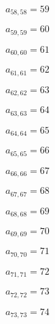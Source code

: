 \documentclass[a4paper,12pt]{article}
\begin{document}
$a _{ 58, 58 } = 59$

$a _{ 59, 59 } = 60$

$a _{ 60, 60 } = 61$

$a _{ 61, 61 } = 62$

$a _{ 62, 62 } = 63$

$a _{ 63, 63 } = 64$

$a _{ 64, 64 } = 65$

$a _{ 65, 65 } = 66$

$a _{ 66, 66 } = 67$

$a _{ 67, 67 } = 68$

$a _{ 68, 68 } = 69$

$a _{ 69, 69 } = 70$

$a _{ 70, 70 } = 71$

$a _{ 71, 71 } = 72$

$a _{ 72, 72 } = 73$

$a _{ 73, 73 } = 74$
\end{document}

